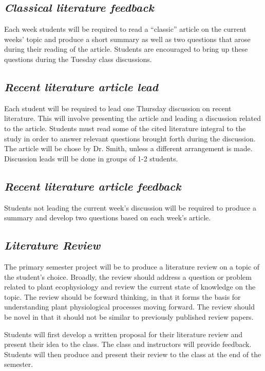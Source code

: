 \documentclass[12pt, notitlepage]{article}   	%
\begin{document}
{\subsection{\textit{Classical literature feedback}}
Each week students will be required to read a “classic” article on the current weeks’ 
topic and produce a short summary as well as two questions that arose during their 
reading of the article. Students are encouraged to bring up these questions during the
Tuesday class discussions.

\subsection{\textit{Recent literature article lead}}
Each student will be required to lead one Thursday discussion on recent literature. 
This will involve presenting the article 
and leading a discussion related to the article. Students must read some of the cited
literature integral to the study 
in order to answer relevant questions brought forth during the discussion.
The article will be chose by Dr. Smith, unless a different arrangement is made.
Discussion leads will be done in groups of 1-2 students.

\subsection{\textit{Recent literature article feedback}}
Students not leading the current week’s 
discussion will be required to produce a summary and 
develop two questions based on each week’s article.

\subsection{\textit{Literature Review}}
The primary semester project will be to produce a literature review on a topic 
of the student's choice.
Broadly, the review should address a question or problem related 
to plant ecophysiology and review the current state of knowledge on the topic.
The review should be forward thinking, in that it forms the
basis for understanding plant physiological processes moving forward.
The review should be novel in that it should not be similar to previously published
review papers.

Students will first develop a written proposal for their literature review and present 
their idea to the class. The class and instructors will provide feedback. Students will then produce and present 
their review to the class at the end of the semester. 

}
\end{document}
